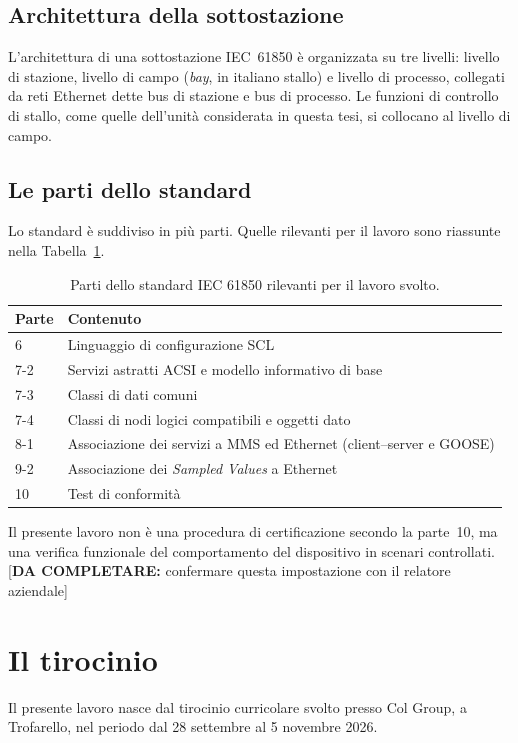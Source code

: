 \documentclass[11pt,a4paper,italian,oneside,openany]{book}
\newcommand{\daf}[1]{{\color{red}[\textbf{DA COMPLETARE:} #1]}}
\begin{document}
\subsection{Architettura della sottostazione}
L'architettura di una sottostazione IEC~61850 è organizzata su tre livelli: livello di stazione, livello di campo (\textit{bay}, in italiano stallo) e livello di processo, collegati da reti Ethernet dette bus di stazione e bus di processo. Le funzioni di controllo di stallo, come quelle dell'unità considerata in questa tesi, si collocano al livello di campo.

\subsection{Le parti dello standard}
Lo standard è suddiviso in più parti. Quelle rilevanti per il lavoro sono riassunte nella Tabella~\ref{tab:parti}.

\begin{table}[htbp]
\centering
\begin{tabular}{@{}lp{10.5cm}@{}}
\toprule
\textbf{Parte} & \textbf{Contenuto} \\
\midrule
6 & Linguaggio di configurazione SCL \\
7-2 & Servizi astratti ACSI e modello informativo di base \\
7-3 & Classi di dati comuni \\
7-4 & Classi di nodi logici compatibili e oggetti dato \\
8-1 & Associazione dei servizi a MMS ed Ethernet (client--server e GOOSE) \\
9-2 & Associazione dei \textit{Sampled Values} a Ethernet \\
10 & Test di conformità \\
\bottomrule
\end{tabular}
\caption{Parti dello standard IEC 61850 rilevanti per il lavoro svolto.}
\label{tab:parti}
\end{table}

Il presente lavoro non è una procedura di certificazione secondo la parte~10, ma una verifica funzionale del comportamento del dispositivo in scenari controllati. \daf{confermare questa impostazione con il relatore aziendale}

\section{Il tirocinio}
Il presente lavoro nasce dal tirocinio curricolare svolto presso Col Group, a Trofarello, nel periodo dal 28 settembre al 5 novembre 2026.
\end{document}
